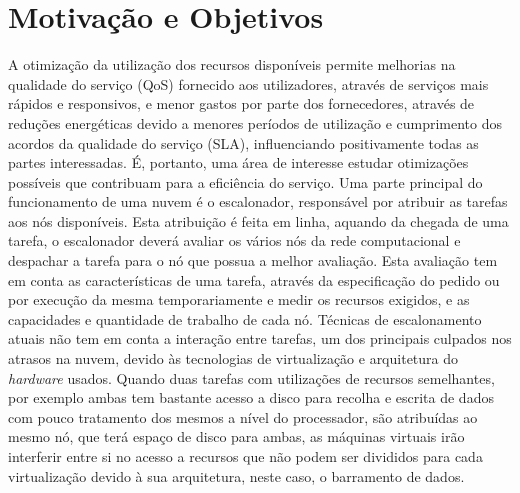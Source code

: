 




\section{Motivação e Objetivos} \label{sec:goals}

A otimização da utilização dos recursos disponíveis permite melhorias na qualidade do serviço (QoS) fornecido aos utilizadores, através de serviços mais rápidos e responsivos, e menor gastos por parte dos fornecedores, através de reduções energéticas devido a menores períodos de utilização e cumprimento dos acordos da qualidade do serviço (SLA), influenciando positivamente todas as partes interessadas. É, portanto, uma área de interesse estudar otimizações possíveis que contribuam para a eficiência do serviço. Uma parte principal do funcionamento de uma nuvem é o escalonador, responsável por atribuir as tarefas aos nós disponíveis. Esta atribuição é feita em linha, aquando da chegada de uma tarefa, o escalonador deverá avaliar os vários nós da rede computacional e despachar a tarefa para o nó que possua a melhor avaliação.
Esta avaliação tem em conta as características de uma tarefa, através da especificação do pedido ou por execução da mesma temporariamente e medir os recursos exigidos, e as capacidades e quantidade de trabalho de cada nó. Técnicas de escalonamento atuais não tem em conta a interação entre tarefas, um dos principais culpados nos atrasos na nuvem, devido às tecnologias de virtualização e arquitetura do \textit{hardware} usados. Quando duas tarefas com utilizações de recursos semelhantes, por exemplo ambas tem bastante acesso a disco para recolha e escrita de dados com pouco tratamento dos mesmos a nível do processador, são atribuídas ao mesmo nó, que terá espaço de disco para ambas, as máquinas virtuais irão interferir entre si no acesso a recursos que não podem ser divididos para cada virtualização devido à sua arquitetura, neste caso, o barramento de dados. 

